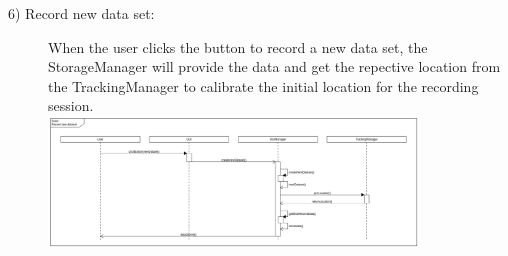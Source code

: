 \begin{description}
	\item[6) Record new data set: ] When the user clicks the button to record a new data set, the StorageManager will provide the data and get the repective location from the TrackingManager to calibrate the initial location for the recording session. \\
	\includegraphics[width=0.8\textwidth]{diagramms/newDataset.png}




\end{description}
